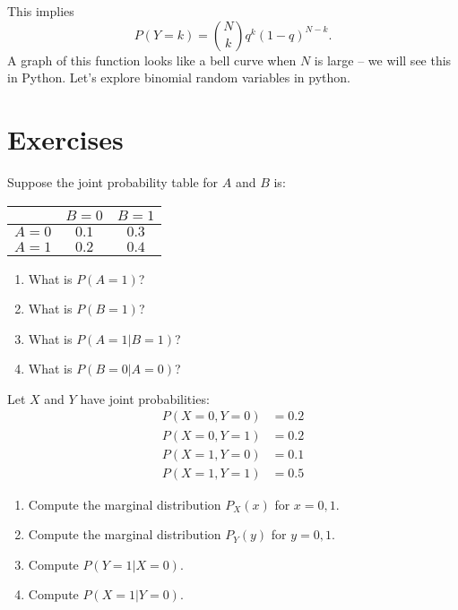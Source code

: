 This implies 
\begin{equation*}
P(Y=k)=  {N \choose k}q^{k}(1-q)^{N-k}. 
\end{equation*}
A graph of this function looks like a bell curve when $N$ is large -- we will see this in Python. Let's explore binomial random variables in python.  


\newpage 

\section*{Exercises}
\begin{exercise}
Suppose the joint probability table for $A$ and $B$ is:
\begin{center}
\begin{tabular}{c|cc}
 & $B=0$ & $B=1$ \\
\hline
$A=0$ & $0.1$ & $0.3$ \\
$A=1$ & $0.2$ & $0.4$ \\
\end{tabular}
\end{center}
\begin{enumerate}[label=(\alph*)]
\item What is $P(A=1)$?
\item What is $P(B=1)$?
\item What is $P(A=1|B=1)$?
\item What is $P(B=0|A=0)$?
\end{enumerate}
\end{exercise}

\begin{exercise}
Let $X$ and $Y$ have joint probabilities:
\begin{align*}
P(X=0, Y=0) &= 0.2 \\
P(X=0, Y=1) &= 0.2 \\
P(X=1, Y=0) &= 0.1 \\
P(X=1, Y=1) &= 0.5
\end{align*}
\begin{enumerate}[label=(\alph*)]
\item Compute the marginal distribution $P_X(x)$ for $x=0,1$.
\item Compute the marginal distribution $P_Y(y)$ for $y=0,1$.
\item Compute $P(Y=1|X=0)$.
\item Compute $P(X=1|Y=0)$.
\end{enumerate}
\end{exercise}

